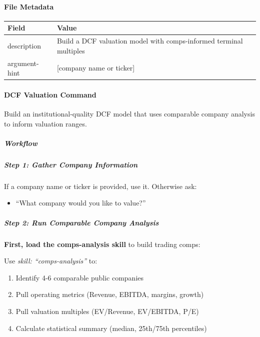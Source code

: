 \documentclass[11pt]{article}
\begin{document}
\paragraph{File Metadata}\mbox{}\par
\begingroup
\small
\setlength{\tabcolsep}{2pt}
\begin{longtable}{>{\RaggedRight\arraybackslash\hspace{0pt}}p{}>{\RaggedRight\arraybackslash\hspace{0pt}}p{}}
\toprule
{} \textbf{Field} & \textbf{Value} \\
\midrule
{} description & Build a DCF valuation model with comps-informed terminal multiples \\
{} argument-hint & [company name or ticker] \\
\bottomrule
\end{longtable}
\endgroup


\paragraph{DCF Valuation Command}\mbox{}\par

Build an institutional-quality DCF model that uses comparable company analysis to inform valuation ranges.


\subparagraph{Workflow}\mbox{}\par

\subparagraph{Step 1: Gather Company Information}\mbox{}\par

If a company name or ticker is provided, use it. Otherwise ask:

\begin{itemize}[leftmargin=*,itemsep=2pt,topsep=2pt]
\item {} ``What company would you like to value?''
\end{itemize}

\subparagraph{Step 2: Run Comparable Company Analysis}\mbox{}\par

\textbf{First, load the comps-analysis skill} to build trading comps:


Use \emph{skill: ``comps-analysis''} to:

\begin{enumerate}[leftmargin=*,itemsep=2pt,topsep=2pt]
\item {} Identify 4-6 comparable public companies
\item {} Pull operating metrics (Revenue, EBITDA, margins, growth)
\item {} Pull valuation multiples (EV/Revenue, EV/EBITDA, P/E)
\item {} Calculate statistical summary (median, 25th/75th percentiles)
\end{enumerate}
\end{document}
